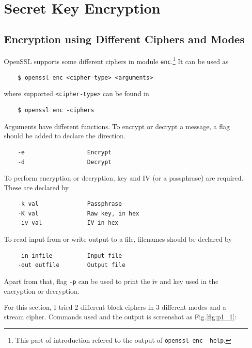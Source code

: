 \section{Secret Key Encryption}

\subsection{Encryption using Different Ciphers and Modes}

OpenSSL supports some different ciphers in module \texttt{enc}.\footnote{This part of introduction refered to the output of \texttt{openssl enc -help}.}
It can be used as 
\begin{verbatim}
    $ openssl enc <cipher-type> <arguments>
\end{verbatim}
where supported \texttt{<cipher-type>} can be found in 
\begin{verbatim}
    $ openssl enc -ciphers
\end{verbatim}

Arguments have different functions. 
To encrypt or decrypt a message, a flag should be added to declare the direction.
\begin{verbatim}
    -e                  Encrypt
    -d                  Decrypt
\end{verbatim}
To perform encryption or decryption, key and IV (or a passphrase) are required. These are declared by 
\begin{verbatim}
    -k val              Passphrase
    -K val              Raw key, in hex
    -iv val             IV in hex
\end{verbatim}
To read input from or write output to a file, filenames should be declared by 
\begin{verbatim}
    -in infile          Input file
    -out outfile        Output file
\end{verbatim}
Apart from that, flag \texttt{-p} can be used to print the iv and key used in the encryption or decryption.

For this section, I tried 2 different block ciphers in 3 different modes and a stream cipher.
Commands used and the output is screenshot as Fig.\ref{fig:p1_1}:

